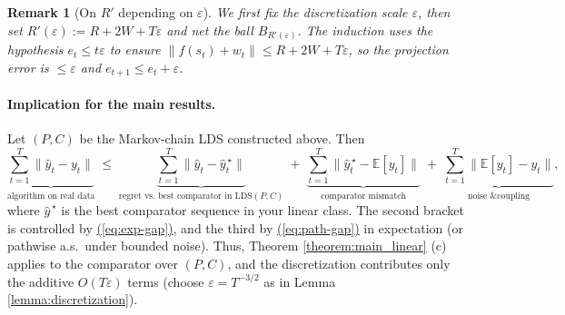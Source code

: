\documentclass[11pt]{article}
\renewcommand{\subset}{\subseteq}
\newcommand{\ignore}[1]{}
\def\epsilon{\varepsilon}
\newtheorem{theorem}{Theorem}[section]
\newtheorem{remark}[theorem]{Remark}
\newcommand{\equationref}[1]{\mbox{\hyperref[#1]{(\ref*{#1})}}}
\renewcommand{\eqref}{\equationref}
\numberwithin{equation}{section}
\begin{document}
{\begin{remark}[On $R'$ depending on $\varepsilon$]
We first fix the discretization scale $\varepsilon$, then set $R'(\varepsilon):=R+2W+T\varepsilon$ and net the
ball $B_{R'(\varepsilon)}$. The induction uses the hypothesis $e_t\le t\varepsilon$ to ensure
$\|f(s_t)+w_t\|\le R+2W+T\varepsilon$, so the projection error is $\le\varepsilon$ and $e_{t+1}\le e_t+\varepsilon$.
\end{remark}


\paragraph{Implication for the main results.}
Let $(P,C)$ be the Markov-chain LDS constructed above. Then
\[
\underbrace{\sum_{t=1}^T\| \hat y_t - y_t\|}_{\text{algorithm on real data}}
\;\le\;
\underbrace{\sum_{t=1}^T\| \hat y_t - \hat y^{\,\star}_t\|}_{\text{regret vs.\ best comparator in }\mathrm{LDS}(P,C)}
\;+\;\underbrace{\sum_{t=1}^T\| \hat y^{\,\star}_t - \mathbb{E}[y_t]\|}_{\text{comparator mismatch}}
\;+\;\underbrace{\sum_{t=1}^T\| \mathbb{E}[y_t]-y_t\|}_{\text{noise \& coupling}},
\]
where $\hat y^{\,\star}$ is the best comparator sequence in your linear class.
The second bracket is controlled by \eqref{eq:exp-gap}, and the third by \eqref{eq:path-gap} in expectation (or pathwise a.s.\ under bounded noise).
Thus, Theorem \ref{theorem:main_linear} (c) applies to the comparator over $(P,C)$, and the discretization contributes only the additive
$O(T\varepsilon)$ terms (choose $\varepsilon=T^{-3/2}$ as in Lemma \ref{lemma:discretization}).%



\ignore{

\begin{theorem}[Discrete Stochastic Koopman Operator Approximates Observations (Discretization Error Only)]
Let $(\mathcal{X}, f)$ be a discrete-time nonlinear dynamical system with additive noise: $x_{t+1} = f(x_t) + w_t$, where $x_t \in \mathcal{X} \subset \mathbb{R}^d$, $w_t$ are i.i.d. random vectors (arbitrary distribution), and $f: \mathcal{X} \to \mathcal{X}$ is $1$-Lipschitz. Let $y_t = h(x_t)$, where $h: \mathcal{X} \to \mathcal{Y} \subset \mathbb{R}^m$ is $1$-Lipschitz.

Assume all states and outputs remain in a ball of radius $R$ for all $t$.

Fix $\epsilon > 0$ and time horizon $T$. Let $S$ be an $\epsilon$-net of the ball of radius $R$ in $\mathbb{R}^d$, with $|S| = N$. Let $\pi: \mathcal{X} \to S$ be the nearest neighbor projection. For each $s^{(j)} \in S$, define transition probabilities
\[
P_{ij} = \mathbb{P}\left( \pi(f(s^{(j)}) + w) = s^{(i)} \right),
\]
where $w$ is distributed as $w_t$. Let $P$ be the $N \times N$ transition matrix.


\end{theorem}}}
\end{document}
